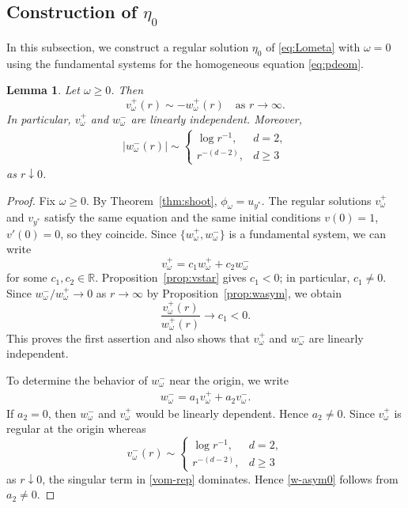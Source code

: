 \documentclass[12pt, a4paper, reqno]{amsart}
\numberwithin{equation}{section}
\newtheorem{lemma}[theorem]{Lemma}
\theoremstyle{definition}
\theoremstyle{remark}
\newcommand{\R}{\mathbb R}
\begin{document}
\subsection{Construction of \texorpdfstring{$\eta_0$}{eta0}}


In this subsection, we construct a regular solution $\eta_0$ of
\eqref{eq:Lometa} with $\omega=0$ using the fundamental systems
for the homogeneous equation \eqref{eq:pdeom}.
\begin{lemma}\label{lem:vw}
Let $\omega\ge0$. Then
\[
  v_\omega^+(r)\sim-w_\omega^+(r)
  \quad\text{as }r\to\infty.
\]
In particular, $v_\omega^+$ and $w_\omega^-$ are linearly independent.
Moreover,
\begin{align}
\label{w-asym0}
  |w_\omega^-(r)|\sim
  \begin{cases}
    \log r^{-1}, & d=2,\\[2pt]
    r^{-(d-2)}, & d\ge3
  \end{cases}
\end{align}
as $r\downarrow0$.
\end{lemma}
\begin{proof}
Fix $\omega\ge0$. By Theorem~\ref{thm:shoot},
$\phi_\omega=u_{y^*}$. The regular solutions $v_\omega^+$ and
$v_{y^*}$ satisfy the same equation and the same initial conditions
$v(0)=1$, $v'(0)=0$, so they coincide. Since
$\{w_\omega^+,w_\omega^-\}$ is a fundamental system, we can write
\[
  v_\omega^+=c_1w_\omega^++c_2w_\omega^-
\]
for some $c_1,c_2\in\R$. Proposition~\ref{prop:vstar} gives
$c_1<0$; in particular, $c_1\ne0$. Since
$w_\omega^-/w_\omega^+\to0$ as $r\to\infty$ by
Proposition~\ref{prop:wasym}, we obtain
\[
  \frac{v_\omega^+(r)}{w_\omega^+(r)}
  \to c_1<0.
\]
This proves the first assertion and also shows that
$v_\omega^+$ and $w_\omega^-$ are linearly independent.

To determine the behavior of $w_\omega^-$ near the origin, we write
\begin{align}
\label{vom-rep}
  w_\omega^-
  =a_1v_\omega^+ +a_2v_\omega^-.
\end{align}
If $a_2=0$, then $w_\omega^-$ and $v_\omega^+$ would be linearly
dependent. Hence $a_2\ne0$.
Since $v_\omega^+$ is regular at the origin whereas
\[
  v_\omega^-(r)\sim
  \begin{cases}
    \log r^{-1}, & d=2,\\
    r^{-(d-2)}, & d\ge3
  \end{cases}
\]
as $r\downarrow0$, the singular term in \eqref{vom-rep} dominates.
Hence \eqref{w-asym0} follows from $a_2\ne0$.
\end{proof}
\end{document}
